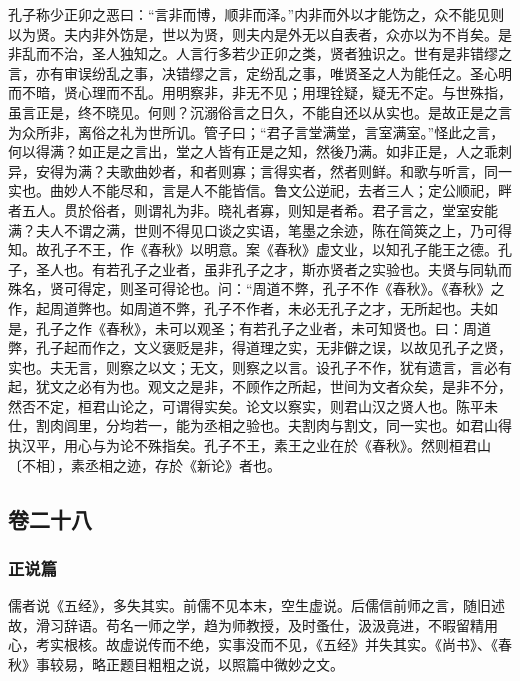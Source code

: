\documentclass[]{article}
\begin{document}
孔子称少正卯之恶曰：``言非而博，顺非而泽。''内非而外以才能饬之，众不能见则以为贤。夫内非外饬是，世以为贤，则夫内是外无以自表者，众亦以为不肖矣。是非乱而不治，圣人独知之。人言行多若少正卯之类，贤者独识之。世有是非错缪之言，亦有审误纷乱之事，决错缪之言，定纷乱之事，唯贤圣之人为能任之。圣心明而不暗，贤心理而不乱。用明察非，非无不见；用理铨疑，疑无不定。与世殊指，虽言正是，终不晓见。何则？沉溺俗言之日久，不能自还以从实也。是故正是之言为众所非，离俗之礼为世所讥。管子曰；``君子言堂满堂，言室满室。''怪此之言，何以得满？如正是之言出，堂之人皆有正是之知，然後乃满。如非正是，人之乖刺异，安得为满？夫歌曲妙者，和者则寡；言得实者，然者则鲜。和歌与听言，同一实也。曲妙人不能尽和，言是人不能皆信。鲁文公逆祀，去者三人；定公顺祀，畔者五人。贯於俗者，则谓礼为非。晓礼者寡，则知是者希。君子言之，堂室安能满？夫人不谓之满，世则不得见口谈之实语，笔墨之余迹，陈在简筴之上，乃可得知。故孔子不王，作《春秋》以明意。案《春秋》虚文业，以知孔子能王之德。孔子，圣人也。有若孔子之业者，虽非孔子之才，斯亦贤者之实验也。夫贤与同轨而殊名，贤可得定，则圣可得论也。问：``周道不弊，孔子不作《春秋》。《春秋》之作，起周道弊也。如周道不弊，孔子不作者，未必无孔子之才，无所起也。夫如是，孔子之作《春秋》，未可以观圣；有若孔子之业者，未可知贤也。曰：周道弊，孔子起而作之，文义褒贬是非，得道理之实，无非僻之误，以故见孔子之贤，实也。夫无言，则察之以文；无文，则察之以言。设孔子不作，犹有遗言，言必有起，犹文之必有为也。观文之是非，不顾作之所起，世间为文者众矣，是非不分，然否不定，桓君山论之，可谓得实矣。论文以察实，则君山汉之贤人也。陈平未仕，割肉闾里，分均若一，能为丞相之验也。夫割肉与割文，同一实也。如君山得执汉平，用心与为论不殊指矣。孔子不王，素王之业在於《春秋》。然则桓君山〔不相〕，素丞相之迹，存於《新论》者也。

\hypertarget{header-n889}{%
\subsection{卷二十八}\label{header-n889}}

\hypertarget{header-n890}{%
\subsubsection{正说篇}\label{header-n890}}

儒者说《五经》，多失其实。前儒不见本末，空生虚说。后儒信前师之言，随旧述故，滑习辞语。苟名一师之学，趋为师教授，及时蚤仕，汲汲竟进，不暇留精用心，考实根核。故虚说传而不绝，实事没而不见，《五经》并失其实。《尚书》、《春秋》事较易，略正题目粗粗之说，以照篇中微妙之文。
\end{document}
